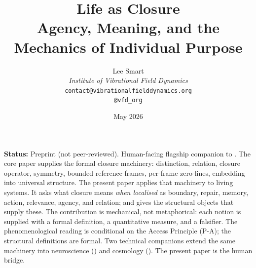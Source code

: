 \documentclass[11pt]{article}
\title{Life as Closure\\[6pt]
\large Agency, Meaning, and the Mechanics of Individual Purpose}
\author{%
  Lee Smart\\[4pt]
  \textit{Institute of Vibrational Field Dynamics}\\[2pt]
  \texttt{contact@vibrationalfielddynamics.org}\\[2pt]
  \texttt{@vfd\_org}%
}
\date{May 2026}
\theoremstyle{plain}
\theoremstyle{definition}
\theoremstyle{remark}
\begin{document}
\maketitle

\noindent\textbf{Status:} Preprint (not peer-reviewed). Human-facing flagship companion to \citet{SmartExistenceClosure}. The core paper supplies the formal closure machinery: distinction, relation, closure operator, symmetry, bounded reference frames, per-frame zero-lines, embedding into universal structure. The present paper applies that machinery to living systems. It asks what closure means \emph{when localised} as boundary, repair, memory, action, relevance, agency, and relation; and gives the structural objects that supply these. The contribution is mechanical, not metaphorical: each notion is supplied with a formal definition, a quantitative measure, and a falsifier. The phenomenological reading is conditional on the Access Principle (P-A); the structural definitions are formal. Two technical companions extend the same machinery into neuroscience (\citet{SmartProcessingToPOV}) and cosmology (\citet{SmartCosmicClosure}). The present paper is the human bridge.
\end{document}
